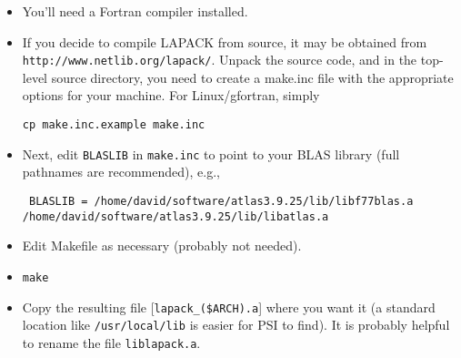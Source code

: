 \documentclass[12pt]{article}
\begin{document}
   \begin{itemize}

   \item
   You'll need a Fortran compiler installed.

   \item
   If you decide to compile LAPACK from source, it may be obtained from \\
   {\tt http://www.netlib.org/lapack/}.  Unpack the source code, and in the
   top-level source directory, you need to create a make.inc file with
   the appropriate options for your machine.  For Linux/gfortran,
   simply

     {\tt cp make.inc.example make.inc}

   \item
   Next, edit {\tt BLASLIB} in {\tt make.inc} to point to your BLAS library
   (full pathnames are recommended), e.g.,

     {\tt
     BLASLIB      = /home/david/software/atlas3.9.25/lib/libf77blas.a \\
/home/david/software/atlas3.9.25/lib/libatlas.a
     }

   \item
   Edit Makefile as necessary (probably not needed).

   \item {\tt make}

   \item
   Copy the resulting file [{\tt lapack\_(\$ARCH).a}] where you want it
   (a standard location like {\tt /usr/local/lib} is easier for PSI to find).
   It is probably helpful to rename the file {\tt liblapack.a}.

   \end{itemize}
\end{document}
